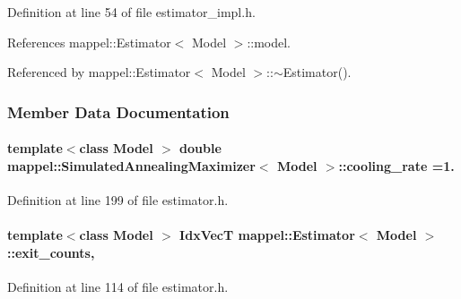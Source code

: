 Definition at line 54 of file estimator\+\_\+impl.\+h.



References mappel\+::\+Estimator$<$ Model $>$\+::model.



Referenced by mappel\+::\+Estimator$<$ Model $>$\+::$\sim$\+Estimator().



\subsubsection{Member Data Documentation}
\paragraph[{\texorpdfstring{cooling\+\_\+rate}{cooling_rate}}]{\setlength{\rightskip}{0pt plus 5cm}template$<$class Model $>$ double {\bf mappel\+::\+Simulated\+Annealing\+Maximizer}$<$ Model $>$\+::cooling\+\_\+rate =1.}\hypertarget{classmappel_1_1SimulatedAnnealingMaximizer_af67fa796254c7b027de1a44b5d33afcb}{}\label{classmappel_1_1SimulatedAnnealingMaximizer_af67fa796254c7b027de1a44b5d33afcb}


Definition at line 199 of file estimator.\+h.

\paragraph[{\texorpdfstring{exit\+\_\+counts}{exit_counts}}]{\setlength{\rightskip}{0pt plus 5cm}template$<$class Model $>$ {\bf Idx\+VecT} {\bf mappel\+::\+Estimator}$<$ Model $>$\+::exit\+\_\+counts\hspace{0.3cm}{\ttfamily [protected]}, {\ttfamily [inherited]}}\hypertarget{classmappel_1_1Estimator_a490b648fdbd7ddae7ce41fbf26e29b48}{}\label{classmappel_1_1Estimator_a490b648fdbd7ddae7ce41fbf26e29b48}


Definition at line 114 of file estimator.\+h.



